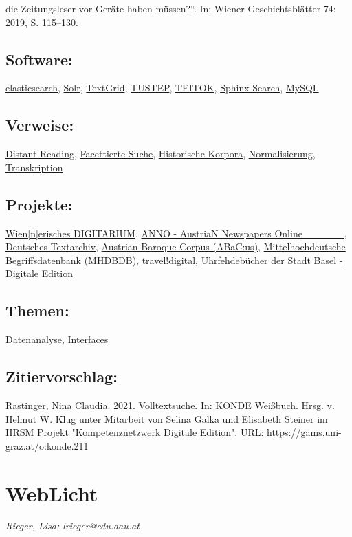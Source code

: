 \documentclass{article}
\begin{document}
\begin{itemize}
                              die Zeitungsleser vor Geräte haben müssen?“. In: Wiener Geschichtsblätter 74: 2019, S. 115–130.\end{itemize}\subsection*{Software:}\href{https://www.elastic.co/de/}{elasticsearch}, \href{http://lucene.apache.org/solr/}{Solr}, \href{https://textgrid.de/}{TextGrid}, \href{http://www.tustep.uni-tuebingen.de/}{TUSTEP}, \href{http://www.teitok.org/index.php?action=about}{TEITOK}, \href{http://sphinxsearch.com/about/sphinx/}{Sphinx Search}, \href{https://www.mysql.com/}{MySQL}\subsection*{Verweise:}\href{https://gams.uni-graz.at/o:konde.71}{Distant Reading}, \href{https://gams.uni-graz.at/o:konde.82}{Facettierte Suche}, \href{https://gams.uni-graz.at/o:konde.94}{Historische Korpora}, \href{https://gams.uni-graz.at/o:konde.146}{Normalisierung}, \href{https://gams.uni-graz.at/o:konde.197}{Transkription}\subsection*{Projekte:}\href{https://digitarium.acdh.oeaw.ac.at/}{Wien[n]erisches DIGITARIUM}, \href{http://anno.onb.ac.at/}{ANNO - AustriaN Newspapers Online         }, \href{http://www.deutschestextarchiv.de/}{Deutsches Textarchiv}, \href{https://acdh.oeaw.ac.at/abacus/}{Austrian Baroque Corpus (ABaC:us)}, \href{http://mhdbdb.sbg.ac.at/}{Mittelhochdeutsche Begriffsdatenbank (MHDBDB)}, \href{https://traveldigital.acdh.oeaw.ac.at/}{travel!digital}, \href{http://gams.uni-graz.at/context:ufbas}{Uhrfehdebücher der Stadt Basel - Digitale Edition}\subsection*{Themen:}Datenanalyse, Interfaces\subsection*{Zitiervorschlag:}Rastinger, Nina Claudia. 2021. Volltextsuche. In: KONDE Weißbuch. Hrsg. v. Helmut W. Klug unter Mitarbeit von Selina Galka und Elisabeth Steiner im HRSM Projekt "Kompetenznetzwerk Digitale Edition". URL: https://gams.uni-graz.at/o:konde.211\newpage\section*{WebLicht} \emph{Rieger, Lisa; lrieger@edu.aau.at }\\
        
\end{document}
